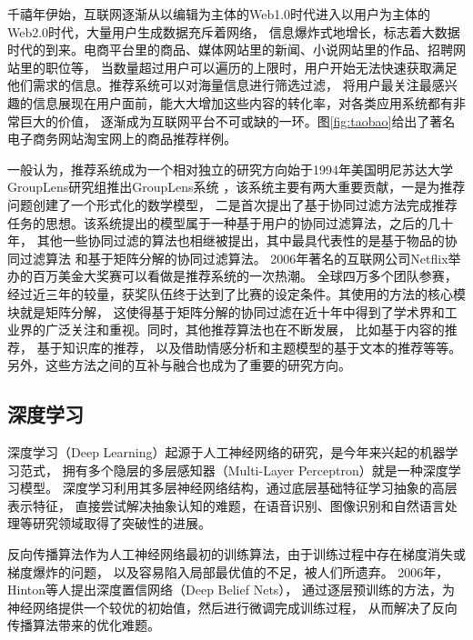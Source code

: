 千禧年伊始，互联网逐渐从以编辑为主体的Web1.0时代进入以用户为主体的Web2.0时代，大量用户生成数据充斥着网络，
信息爆炸式地增长，标志着大数据时代的到来。电商平台里的商品、媒体网站里的新闻、小说网站里的作品、招聘网站里的职位等，
当数量超过用户可以遍历的上限时，用户开始无法快速获取满足他们需求的信息。推荐系统可以对海量信息进行筛选过滤，
将用户最关注最感兴趣的信息展现在用户面前，能大大增加这些内容的转化率，对各类应用系统都有非常巨大的价值，
逐渐成为互联网平台不可或缺的一环。图\ref{fig:taobao}给出了著名电子商务网站淘宝网上的商品推荐样例。

一般认为，推荐系统成为一个相对独立的研究方向始于1994年美国明尼苏达大学GroupLens研究组推出GroupLens系统
\parencite{resnick1994grouplens}，该系统主要有两大重要贡献，一是为推荐问题创建了一个形式化的数学模型，
二是首次提出了基于协同过滤方法完成推荐任务的思想。该系统提出的模型属于一种基于用户的协同过滤算法，之后的几十年，
其他一些协同过滤的算法也相继被提出，其中最具代表性的是基于物品的协同过滤算法\parencite{sarwar2001item}
和基于矩阵分解的协同过滤算法\parencite{koren2009matrix}。
2006年著名的互联网公司Netflix举办的百万美金大奖赛\parencite{bennett2007netflix}可以看做是推荐系统的一次热潮。
全球四万多个团队参赛，经过近三年的较量，获奖队伍终于达到了比赛的设定条件。其使用的方法的核心模块就是矩阵分解，
这使得基于矩阵分解的协同过滤在近十年中得到了学术界和工业界的广泛关注和重视。同时，其他推荐算法也在不断发展，
比如基于内容的推荐\parencite{ricci2011introduction,pazzani2007content}，
基于知识库的推荐\parencite{trewin2000knowledge}，
以及借助情感分析\parencite{ganu2009beyond}和主题模型\parencite{wang2011collaborative}的基于文本的推荐等等。
另外，这些方法之间的互补与融合也成为了重要的研究方向\parencite{burke2002hybrid}。

\subsection{深度学习}
深度学习（Deep Learning）起源于人工神经网络的研究，是今年来兴起的机器学习范式，
拥有多个隐层的多层感知器（Multi-Layer Perceptron）就是一种深度学习模型。
深度学习利用其多层神经网络结构，通过底层基础特征学习抽象的高层表示特征，
直接尝试解决抽象认知的难题，在语音识别、图像识别和自然语言处理等研究领域取得了突破性的进展。

反向传播算法作为人工神经网络最初的训练算法，由于训练过程中存在梯度消失或梯度爆炸的问题，
以及容易陷入局部最优值的不足，被人们所遗弃。
2006年，Hinton等人\parencite{hinton2006fast}提出深度置信网络（Deep Belief Nets），
通过逐层预训练的方法，为神经网络提供一个较优的初始值，然后进行微调完成训练过程，
从而解决了反向传播算法带来的优化难题。

